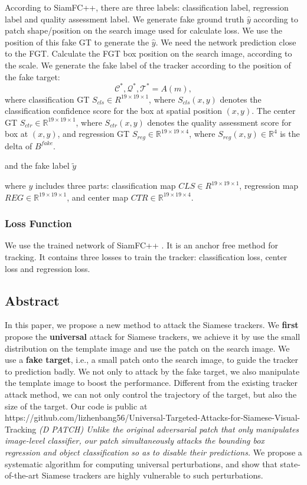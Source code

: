 \documentclass{article}
\begin{document}
According to SiamFC++, there are three labels: classification label, regression label and quality assessment label.
We generate fake ground truth $\hat y$ according to patch shape/position on the search image  used for calculate loss.
We use the position of this fake GT to generate the $\hat y$.
We need the network prediction close to the FGT.
Calculate the FGT box position on the search image, according to the scale.
We generate the fake label of the tracker according to the position of the fake target:
\begin{equation}
\mathcal{C^*, Q^*, T^*} = A(m),
\end{equation}
where classification GT $S_{cls} \in R^{19 \times 19 \times 1}$, where $S_{cls}(x,y)$ denotes the classification confidence score for the box at spatial position $(x,y)$. The center GT $S_{ctr} \in \mathbb{R}^{19 \times 19 \times 1}$, where $S_{ctr}(x,y)$ denotes the quality assessment score for box at $(x,y)$, and regression GT $S_{reg} \in \mathbb{R}^{19 \times 19 \times 4}$, where $S_{reg}(x,y) \in \mathbb R^{4}$ is the delta of $B^{fake}$.

and the fake label $\tilde y$

where $y$ includes three parts: classification map $CLS \in R^{19 \times 19 \times 1}$, regression map $REG \in \mathbb{R}^{19 \times 19 \times 1}$, and center map $CTR \in \mathbb{R}^{19 \times 19 \times 4}$.

\subsubsection{Loss Function}

We use the trained network of SiamFC++ \cite{SiamFC++}.
It is an anchor free method for tracking. It contains three losses to train the tracker: classification loss, center loss and regression loss.

\subsection{Abstract}

In this paper, we propose a new method to attack the Siamese trackers. 
We \textbf{first} propose the \textbf{universal} attack for Siamese trackers, we achieve it by use the small distribution on the template image and use the patch on the search image.
We use a \textbf{fake target}, i.e., a small patch onto the search image, to guide the tracker to prediction badly.
We not only to attack by the fake target, we also manipulate the template image to boost the performance.
Different from the existing tracker attack method, we can not only control the trajectory of the target, but also the size of the target.
Our code is public at https://github.com/lizhenbang56/Universal-Targeted-Attacks-for-Siamese-Visual-Tracking
\textit{(D PATCH) Unlike the original adversarial patch that only manipulates image-level classifier, our patch simultaneously attacks the bounding box regression and object classification so as to disable their predictions.}
We propose a systematic algorithm for computing universal perturbations, and show that state-of-the-art Siamese trackers are highly vulnerable to such perturbations.
\end{document}
